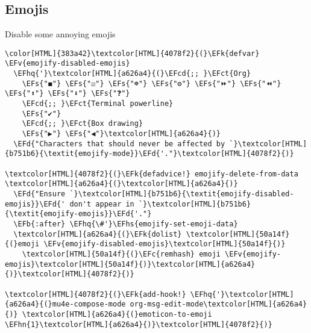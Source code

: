 \documentclass{scrartcl}
\newcommand{\EFk}[1]{\textcolor{EFk}{#1}} %
\newcommand{\EFd}[1]{\textcolor{EFd}{\textit{#1}}} %
\newcommand{\EFs}[1]{\textcolor{EFs}{#1}} %
\newcommand{\EFb}[1]{\textcolor{EFb}{#1}} %
\newcommand{\EFct}[1]{\textcolor{EFct}{#1}} %
\newcommand{\EFc}[1]{\textcolor{EFc}{#1}} %
\newcommand{\EFv}[1]{\textcolor{EFv}{#1}} %
\newcommand{\EFcd}[1]{\textcolor{EFcd}{#1}} %
\newcommand{\EFhn}[1]{\textcolor{EFhn}{\textbf{#1}}} %
\newcommand{\EFhq}[1]{\textcolor{EFhq}{#1}} %
\newcommand{\EFhs}[1]{\textcolor{EFhs}{#1}} %
\begin{document}
\subsection{Emojis}
\label{sec:org826eab9}
Disable some annoying emojis
\begin{Code}
\begin{Verbatim}[]
\color[HTML]{383a42}\textcolor[HTML]{4078f2}{(}\EFk{defvar} \EFv{emojify-disabled-emojis}
  \EFhq{'}\textcolor[HTML]{a626a4}{(}\EFcd{;; }\EFct{Org}
    \EFs{"◼"} \EFs{"☑"} \EFs{"☸"} \EFs{"⚙"} \EFs{"⏩"} \EFs{"⏪"} \EFs{"⬆"} \EFs{"⬇"} \EFs{"❓"}
    \EFcd{;; }\EFct{Terminal powerline}
    \EFs{"✔"}
    \EFcd{;; }\EFct{Box drawing}
    \EFs{"▶"} \EFs{"◀"}\textcolor[HTML]{a626a4}{)}
  \EFd{"Characters that should never be affected by `}\textcolor[HTML]{b751b6}{\textit{emojify-mode}}\EFd{'."}\textcolor[HTML]{4078f2}{)}

\textcolor[HTML]{4078f2}{(}\EFk{defadvice!} emojify-delete-from-data \textcolor[HTML]{a626a4}{(}\textcolor[HTML]{a626a4}{)}
  \EFd{"Ensure `}\textcolor[HTML]{b751b6}{\textit{emojify-disabled-emojis}}\EFd{' don't appear in `}\textcolor[HTML]{b751b6}{\textit{emojify-emojis}}\EFd{'."}
  \EFb{:after} \EFhq{\#'}\EFhs{emojify-set-emoji-data}
  \textcolor[HTML]{a626a4}{(}\EFk{dolist} \textcolor[HTML]{50a14f}{(}emoji \EFv{emojify-disabled-emojis}\textcolor[HTML]{50a14f}{)}
    \textcolor[HTML]{50a14f}{(}\EFc{remhash} emoji \EFv{emojify-emojis}\textcolor[HTML]{50a14f}{)}\textcolor[HTML]{a626a4}{)}\textcolor[HTML]{4078f2}{)}

\textcolor[HTML]{4078f2}{(}\EFk{add-hook!} \EFhq{'}\textcolor[HTML]{a626a4}{(}mu4e-compose-mode org-msg-edit-mode\textcolor[HTML]{a626a4}{)} \textcolor[HTML]{a626a4}{(}emoticon-to-emoji \EFhn{1}\textcolor[HTML]{a626a4}{)}\textcolor[HTML]{4078f2}{)}
\end{Verbatim}
\end{Code}
\end{document}
